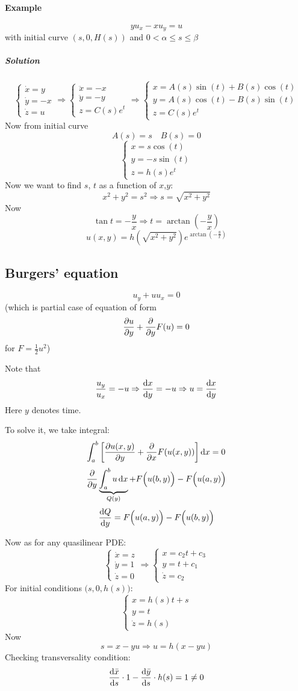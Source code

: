 \paragraph{Example}
$$yu_x - xu_y = u$$
with initial curve $(s,0,H(s))$ and $0<\alpha\leq s\leq \beta$
\subparagraph{Solution}
$$\begin{cases}
\dot{x} = y\\
\dot{y} = -x\\
\dot{z} = u
\end{cases} \Rightarrow \begin{cases}
\ddot{x} = -x\\
\ddot{y} = -y\\
z = C(s)e^t
\end{cases} \Rightarrow \begin{cases}
x = A(s)\sin(t)+B(s)\cos(t)\\
y = A(s)\cos(t)-B(s)\sin(t)\\
z = C(s)e^t
\end{cases}$$
Now from initial curve
$$A(s)= s \quad B(s) = 0$$
$$ \begin{cases}
x = s\cos(t)\\
y = -s\sin(t)\\
z = h(s)e^t
\end{cases}$$
Now we want to find $s$, $t$ as a function of $x$,$y$:
$$x^2+y^2 = s^2 \Rightarrow s = \sqrt{x^2+y^2}$$
Now
$$\tan t  = -\frac{y}{x} \Rightarrow t = \arctan \left(-\frac{y}{x}\right)$$
$$u(x,y)  = h\left(\sqrt{x^2+y^2}\right)e^{ \arctan \left(-\frac{y}{x}\right)}$$


\subsection{Burgers' equation}
$$u_y + uu_x = 0$$
(which is partial case of equation of form $$\pdv{u}{y} + \pdv{ y} F(u) = 0$$ for $F=\frac{1}{2}u^2$)

Note that $$\frac{u_y}{u_x} = -u \Rightarrow \dv{x}{y} = - u \Rightarrow u = \dv{x}{y}$$
Here $y$ denotes time.

To solve it, we take integral:
$$\int_a^b \left[ \pdv{ u(x,y)}{y} + \pdv {x} F(u(x,y))\right] \dd{x} = 0$$
$$\pdv{y} \underbrace{\int_a^b u \dd{x}}_{Q(y)}  + F\Big(u(b,y)\Big) - F\Big(u(a,y)\Big)$$
$$\dv{Q}{y} = F\Big(u(a,y)\Big) - F\Big(u(b,y)\Big)$$

Now as for any quasilinear PDE:
$$\begin{cases}
\dot{x}= z\\\dot{y} = 1\\\dot{z}= 0
\end{cases} \Rightarrow \begin{cases}
x= c_2 t + c_3\\y = t + c_1\\\dot{z}= c_2
\end{cases} $$
For initial conditions $\Big(s,0,h(s)\Big)$:
$$ \begin{cases}
x= h(s) t + s\\y = t \\\dot{z}= h(s)
\end{cases} $$
Now 
$$s=x-yu \Rightarrow u = h(x-yu)$$
Checking transversality condition:
$$\dv{\bar{x}}{s} \cdot 1 - \dv{\bar{y}}{s} \cdot h(s) = 1 \neq 0$$  


